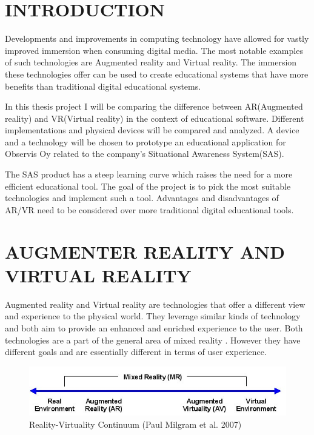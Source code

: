 \documentclass[12pt, a4paper,oneside, nocenter]{thesis}
\begin{document}
\chapter{\MakeUppercase{Introduction}}
Developments and improvements in computing technology have allowed for vastly improved immersion when consuming digital media. The most notable examples of such technologies are Augmented reality and Virtual reality. The immersion these technologies offer can be used to create educational systems that have more benefits than traditional digital educational systems. \par
In this thesis project I will be comparing the difference between AR(Augmented reality) and VR(Virtual reality) in the context of educational software. Different implementations and physical devices will be compared and analyzed. A device and a technology will be chosen to prototype an educational application for Observis Oy related to the company's Situational Awareness System(SAS).\par The SAS product has a steep learning curve which raises the need for a more efficient educational tool. The goal of the project is to pick the most suitable technologies and implement such a tool. Advantages and disadvantages of AR/VR need to be considered over more traditional digital educational tools.
\\
\chapter{\MakeUppercase{Augmenter Reality and Virtual Reality}}
Augmented reality and Virtual reality are technologies that offer a different view and experience to the physical world. They leverage similar kinds of technology and both aim to provide an enhanced and enriched experience to the user. Both technologies are a part of the general area of mixed reality . However they have different goals and are essentially different in terms of user experience.

\begin{figure}[H]
\includegraphics[width=\textwidth]{Virtuality_Continuum_2}
\caption{Reality-Virtuality Continuum (Paul Milgram et al. 2007)}
\label{fig:reality-virtuality}
\end{figure}
\end{document}

